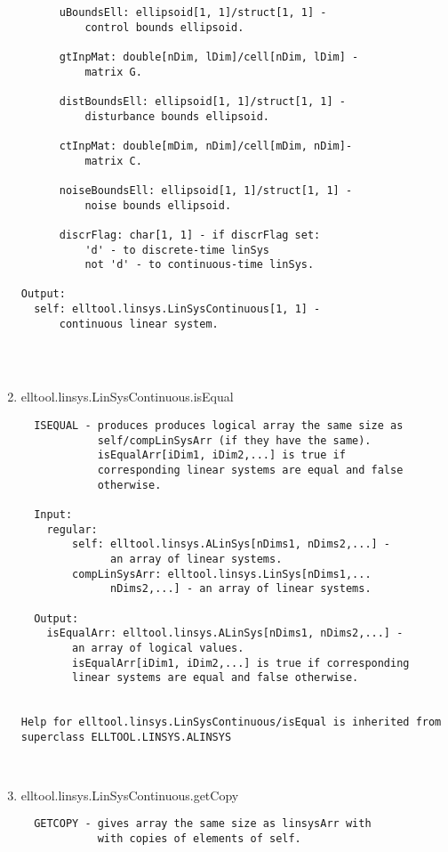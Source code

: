 \begin{enumerate}
\begin{lstlisting}
      uBoundsEll: ellipsoid[1, 1]/struct[1, 1] -
          control bounds ellipsoid.

      gtInpMat: double[nDim, lDim]/cell[nDim, lDim] -
          matrix G.

      distBoundsEll: ellipsoid[1, 1]/struct[1, 1] -
          disturbance bounds ellipsoid.

      ctInpMat: double[mDim, nDim]/cell[mDim, nDim]-
          matrix C.

      noiseBoundsEll: ellipsoid[1, 1]/struct[1, 1] -
          noise bounds ellipsoid.

      discrFlag: char[1, 1] - if discrFlag set:
          'd' - to discrete-time linSys
          not 'd' - to continuous-time linSys.

Output:
  self: elltool.linsys.LinSysContinuous[1, 1] -
      continuous linear system.




\end{lstlisting}
\fontfamily{\familydefault}
\selectfont
\item {elltool.linsys.LinSysContinuous.isEqual}
\selectfont
\begin{lstlisting}
  ISEQUAL - produces produces logical array the same size as
            self/compLinSysArr (if they have the same).
            isEqualArr[iDim1, iDim2,...] is true if
            corresponding linear systems are equal and false
            otherwise.

  Input:
    regular:
        self: elltool.linsys.ALinSys[nDims1, nDims2,...] -
              an array of linear systems.
        compLinSysArr: elltool.linsys.LinSys[nDims1,...
              nDims2,...] - an array of linear systems.

  Output:
    isEqualArr: elltool.linsys.ALinSys[nDims1, nDims2,...] -
        an array of logical values.
        isEqualArr[iDim1, iDim2,...] is true if corresponding
        linear systems are equal and false otherwise.


Help for elltool.linsys.LinSysContinuous/isEqual is inherited from superclass ELLTOOL.LINSYS.ALINSYS



\end{lstlisting}
\fontfamily{\familydefault}
\selectfont
\item {elltool.linsys.LinSysContinuous.getCopy}
\selectfont
\begin{lstlisting}
  GETCOPY - gives array the same size as linsysArr with
            with copies of elements of self.


\end{lstlisting}
\end{enumerate}
